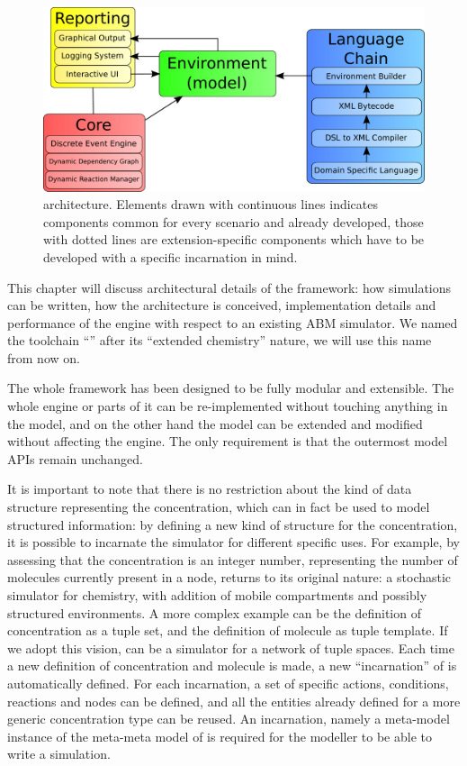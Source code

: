 \documentclass[12pt,a4paper,twoside,openright]{book}
\begin{document}
\label{subsec:architecture}
\begin{figure}%
  \begin{center}
    \includegraphics[width=0.9\columnwidth]{img/schemas/architecture}
    \caption[\alchemist{} architecture]{\alchemist{} architecture. Elements drawn with continuous lines indicates components common for every scenario and already developed, those with dotted lines are extension-specific components which have to be developed with a specific incarnation in mind.}
    \label{img:arch}
  \end{center}
\end{figure}

This chapter will discuss architectural details of the framework: how simulations can be written, how the architecture is conceived, implementation details and performance of the engine with respect to an existing ABM simulator. We named the toolchain ``\alchemist{}'' after its ``extended chemistry'' nature, we will use this name from now on.

The whole framework has been designed to be fully modular and extensible.
%
The whole engine or parts of it can be re-implemented without touching anything in the model, and on the other hand the model can be extended and modified without affecting the engine.
%
The only requirement is that the outermost model APIs remain unchanged.

It is important to note that there is no restriction about the kind of data structure representing the concentration, which can in fact be used to model structured information: by defining a new kind of structure for the concentration, it is possible to incarnate the simulator for different specific uses.
%
For example, by assessing that the concentration is an integer number, representing the number of molecules currently present in a node, \alchemist{} returns to its original nature: a stochastic simulator for chemistry, with addition of mobile compartments and possibly structured environments.
%
A more complex example can be the definition of concentration as a tuple set, and the definition of molecule as tuple template.
%
If we adopt this vision, \alchemist{} can be a simulator for a network of tuple spaces.
%
Each time a new definition of concentration and molecule is made, a new ``incarnation'' of \alchemist{} is automatically defined. For each incarnation, a set of specific actions, conditions, reactions and nodes can be defined, and all the entities already defined for a more generic concentration type can be reused.
%
An incarnation, namely a meta-model instance of the meta-meta model of \alchemist{} is required for the modeller to be able to write a simulation.
\end{document}
